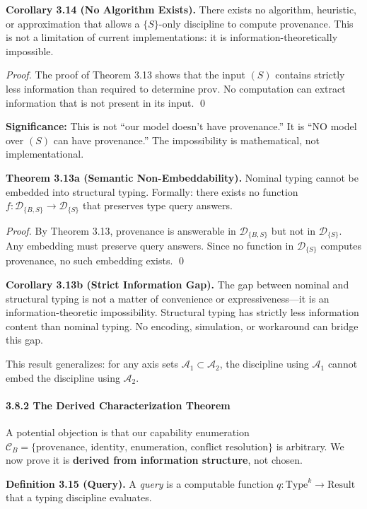 \textbf{Corollary 3.14 (No Algorithm Exists).} There exists no
algorithm, heuristic, or approximation that allows a $\{S\}$-only discipline to
compute provenance. This is not a limitation of current
implementations: it is information-theoretically impossible.

\emph{Proof.} The proof of Theorem 3.13 shows that the input \((S)\)
contains strictly less information than required to determine
\(\text{prov}\). No computation can extract information that is not
present in its input. \qed

\textbf{Significance:} This is not ``our model doesn't have
provenance.'' It is ``NO model over \((S)\) can have provenance.''
The impossibility is mathematical, not implementational.

\textbf{Theorem 3.13a (Semantic Non-Embeddability).}\label{thm:non-embeddability}
Nominal typing cannot be embedded into structural typing. Formally: there exists no function \(f : \mathcal{D}_{\{B,S\}} \to \mathcal{D}_{\{S\}}\) that preserves type query answers.

\emph{Proof.} By Theorem 3.13, provenance is answerable in \(\mathcal{D}_{\{B,S\}}\) but not in \(\mathcal{D}_{\{S\}}\). Any embedding must preserve query answers. Since no function in \(\mathcal{D}_{\{S\}}\) computes provenance, no such embedding exists. \qed

\textbf{Corollary 3.13b (Strict Information Gap).} The gap between nominal and structural typing is not a matter of convenience or expressiveness---it is an information-theoretic impossibility. Structural typing has strictly less information content than nominal typing. No encoding, simulation, or workaround can bridge this gap.

This result generalizes: for any axis sets \(\mathcal{A}_1 \subset \mathcal{A}_2\), the discipline using \(\mathcal{A}_1\) cannot embed the discipline using \(\mathcal{A}_2\).

\paragraph{3.8.2 The Derived Characterization
Theorem}\label{the-derived-characterization-theorem}

A potential objection is that our capability enumeration
\(\mathcal{C}_B = \{\text{provenance, identity, enumeration, conflict resolution}\}\)
is arbitrary. We now prove it is \textbf{derived from information
structure}, not chosen.

\textbf{Definition 3.15 (Query).} A \emph{query} is a computable
function \(q : \text{Type}^k \to \text{Result}\) that a typing
discipline evaluates.

